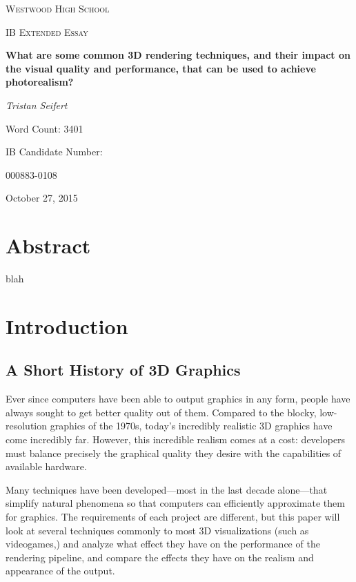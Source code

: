 \documentclass[11pt, oneside]{report}
\begin{document}
\begin{titlepage}
	\centering
	{\scshape\LARGE Westwood High School \par}
	\vspace{0.66cm}
	{\scshape\Large IB Extended Essay\par}
	\vspace{1.5cm}
	{\huge\bfseries What are some common 3D rendering techniques, and their impact on the visual quality and performance, that can be used to achieve photorealism?\par}
	\vspace{1.5cm}
	{\Large\itshape Tristan Seifert\par}
	\vspace{0.33cm}
	{\large Word Count: 3401\par}
	\vfill
	
	IB Candidate Number:\par
	000883-0108

	\vfill

	{\large October 27, 2015 \par}
\end{titlepage}

{
	\renewcommand{\addtocontents}[2]{}
	\chapter*{Abstract}
}
blah

\tableofcontents

\chapter{Introduction}
\section{A Short History of 3D Graphics}
Ever since computers have been able to output graphics in any form, people have always sought to get better quality out of them. Compared to the blocky, low-resolution graphics of the 1970s, today’s incredibly realistic 3D graphics have come incredibly far. However, this incredible realism comes at a cost: developers must balance precisely the graphical quality they desire with the capabilities of available hardware.

Many techniques have been developed—most in the last decade alone—that simplify natural phenomena so that computers can efficiently approximate them for graphics. The requirements of each project are different, but this paper will look at several techniques commonly to most 3D visualizations (such as videogames,) and analyze what effect they have on the performance of the rendering pipeline, and compare the effects they have on the realism and appearance of the output.
\end{document}
